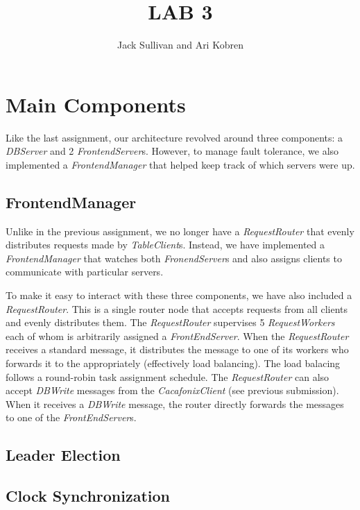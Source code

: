 \documentclass[11pt]{article}
\begin{document}
\title{LAB 3}
\author{Jack Sullivan and Ari Kobren}
\maketitle

\section{Main Components}
\label{sec:main}
Like the last assignment, our architecture revolved around three
components: a \emph{DBServer} and 2 \emph{FrontendServer}s.  However,
to manage fault tolerance, we also implemented a
\emph{FrontendManager} that helped keep track of which servers were
up.

\subsection{FrontendManager}
\label{sec:manager}
Unlike in the previous assignment, we no longer have a
\emph{RequestRouter} that evenly distributes requests made by
\emph{TableClient}s.  Instead, we have implemented a
\emph{FrontendManager} that watches both \emph{FronendServer}s and
also assigns clients to communicate with particular servers.




To make it easy to interact with these three components, we have also
included a \emph{RequestRouter}.  This is a single router node that
accepts requests from all clients and evenly distributes them. The
\emph{RequestRouter} supervises 5 \emph{RequestWorkers} each of whom
is arbitrarily assigned a \emph{FrontEndServer}. When the
\emph{RequestRouter} receives a standard message, it distributes the
message to one of its workers who forwards it to the appropriately
(effectively load balancing). The load balacing follows a round-robin
task assignment schedule.  The \emph{RequestRouter} can also accept
\emph{DBWrite} messages from the \emph{CacafonixClient} (see previous
submission).  When it receives a \emph{DBWrite} message, the router
directly forwards the messages to one of the \emph{FrontEndServer}s.

\subsection{Leader Election}
\label{subsec:leader}

\subsection{Clock Synchronization}
\label{subsec:sync}
\end{document}
